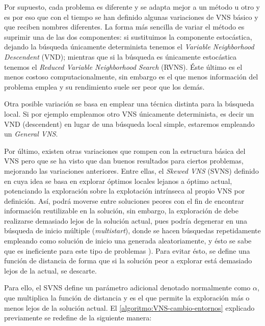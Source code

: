 Por supuesto, cada problema es diferente y se adapta mejor a un método u otro y es por eso que con el tiempo se han definido algunas variaciones de VNS básico y que reciben nombres diferentes. La forma más sencilla de variar el método es suprimir una de las dos componentes: si sustituimos la componente estocástica, dejando la búsqueda únicamente determinista tenemos el \textit{Variable Neighborhood Descendent} (VND); mientras que si la búsqueda es únicamente estocástica tenemos el \textit{Reduced Variable Neighborhood Search} (RVNS). Éste último es el menos costoso computacionalmente, sin embargo es el que menos información del problema emplea y su rendimiento suele ser peor que los demás. 

Otra posible variación se basa en  emplear una técnica distinta para la búsqueda local. Si por ejemplo empleamos otro VNS únicamente determinista, es decir un VND (descendent) en lugar de una búsqueda local simple, estaremos empleando un \textit{General VNS}.

Por último, existen otras variaciones que rompen con la estructura básica del VNS pero que se ha visto que dan buenos resultados para ciertos problemas,  mejorando las variaciones anteriores. Entre ellas, el \textit{Skewed VNS} (SVNS) definido en \cite{svns-def} cuya idea se basa en explorar óptimos locales lejanos a óptimo actual, potenciando la exploración sobre la explotación intrínseca al propio VNS por definición. Así, podrá moverse entre soluciones peores con el fin de encontrar información reutilizable en la solución, sin embargo, la exploración de debe realizarse demasiado lejos de la solución actual, pues podría degenerar en una búsqueda de inicio múltiple (\textit{multistart}), donde se hacen búsquedas repetidamente empleando como solución de inicio una generada aleatoriamente, y ésto se sabe que es ineficiente para este tipo de problemas \cite{vns}). Para evitar ésto, se define una función de distancia de forma que si la solución peor a explorar está demasiado lejos de la actual, se descarte.

Para ello, el SVNS define un parámetro adicional denotado normalmente como $\alpha$, que multiplica la función de distancia y es el que permite la exploración más o menos lejos de la solución actual. El \autoref{algoritmo:VNS-cambio-entornos} explicado previamente se redefine de la siguiente manera:

